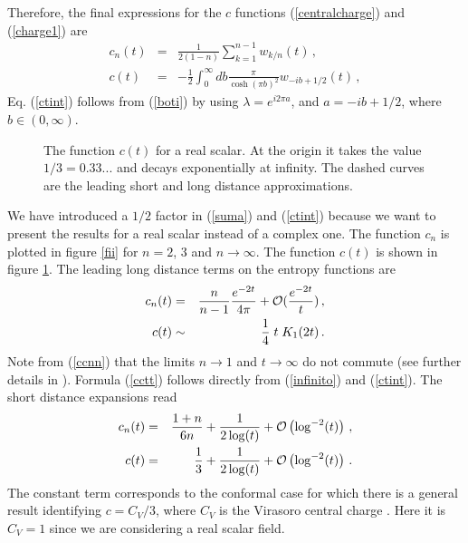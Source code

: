 \documentclass[11pt]{article}
\begin{document}
Therefore, the final expressions for the $c$ functions (\ref{centralcharge}) and (\ref{charge1}) are
\begin{eqnarray}
c_n(t)&=&\frac{1}{2(1-n)}\sum_{k=1}^{n-1} w_{k/n}(t)\label{suma}\,,\\
c(t)&=&-\frac{1}{2}\int_0^{\infty}db \frac{\pi}{\cosh(\pi b)^2}w_{-i b+1/2}(t)\label{ctint}\,,
\end{eqnarray}
Eq. (\ref{ctint}) follows from (\ref{boti}) by using $\lambda=e^{i 2\pi a}$, and $a=-i b+1/2$, where $b\in (0, \infty)$.
\begin{figure} [tbp]
\centering
\leavevmode
\epsfxsize=7.5cm
\bigskip
{}
\caption{The function $c(t)$ for a real scalar. At the origin it takes the value $1/3=0.33...$ and decays exponentially at infinity. The dashed curves are the leading short and long distance approximations.}\label{fiiii}
\end{figure}
We have introduced a $1/2$ factor in (\ref{suma}) and (\ref{ctint}) because we want to present the results for a real scalar  instead of a complex one. The function $c_n$ is plotted in figure \ref{fii} for $n=2$, $3$ and $n\rightarrow \infty$. The function $c(t)$ is shown in figure \ref{fiiii}.
The leading long distance terms on the entropy functions are
\begin{eqnarray}
c_{n }(t)&=&\frac{n}{n-1}\frac{e^{-2t}}{4\pi}+{\cal O}(\frac{e^{-2t}}{t})\,,\label{ccnn}\\
c(t)&\sim& \frac{1}{4}\;t \;K_1(2t) \label{cctt}\,.
\end{eqnarray}
Note from (\ref{ccnn}) that the limits $n\rightarrow1$ and $t\rightarrow\infty$ do not commute (see further details in \cite{fermion,dc}). Formula (\ref{cctt}) follows directly from (\ref{infinito}) and (\ref{ctint}). The short distance expansions read
\begin{eqnarray}
c_n(t)&=&\frac{1+n}{6 n}+\frac{1}{2\log(t)}+{\cal O}\left(\log^{-2}(t)\right)\,,\\
c(t)&=&\frac{1}{3}+\frac{1}{2\log(t)}+{\cal O}\left(\log^{-2}(t)\right)\,.\label{cuyas}
\end{eqnarray}
The constant term corresponds to the conformal case for which there is a general result identifying $c=C_V/3$, where $C_V$ is the Virasoro central charge \cite{ci,cc}. Here it is $C_V=1$ since we are considering a real scalar field.
\end{document}
